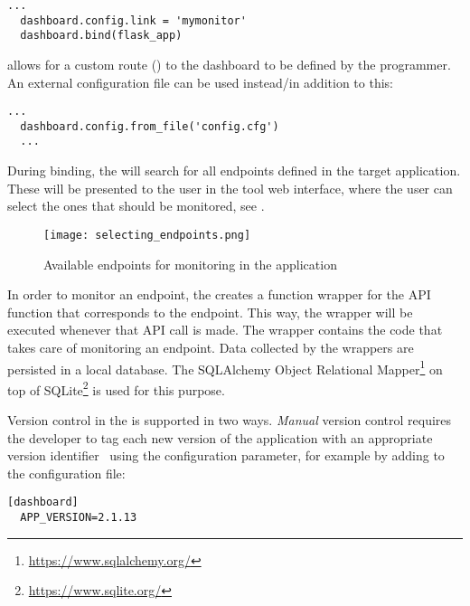 \documentclass{sig-alternate-05-2015}
\begin{document}
  \begin{lstlisting}[style=custompython]
  ...
  dashboard.config.link = 'mymonitor'
  dashboard.bind(flask_app)
  \end{lstlisting}
  
  allows for a custom route () to the dashboard to be defined by the programmer. An external configuration file can be used instead/in addition to this:
  
  \begin{lstlisting}[style=custompython]
  ...
  dashboard.config.from_file('config.cfg')
  ...
  \end{lstlisting}

  During binding, the \tool will search for all endpoints defined in the target application. These will be presented to the user in the tool web interface, where the user can select the ones that should be monitored, see . 

    \begin{figure}
      \centering
      \texttt{[image: selecting\_endpoints.png]}
      \caption{Available endpoints for monitoring in the \zee application}
      \label{fig:sep}
    \end{figure}

  In order to monitor an endpoint, the \tool creates a function wrapper for the API function that corresponds to the endpoint. This way, the wrapper will be executed whenever that API call is made. The wrapper contains the code that takes care of monitoring an endpoint. Data collected by the wrappers are persisted in a local database. The SQLAlchemy Object Relational Mapper\footnote{\url{https://www.sqlalchemy.org/}} on top of SQLite\footnote{\url{https://www.sqlite.org/}} is used for this purpose.
  
  
  Version control in the \tool is supported in two ways. \textit{Manual} version control requires the developer to tag each new version of the application with an appropriate version identifier~\cite{papazoglou2011managing} using the  configuration parameter, for example by adding to the configuration file:
  
  \begin{lstlisting}[style=custompython]
  [dashboard]
  APP_VERSION=2.1.13
  \end{lstlisting}
  
\end{document}
